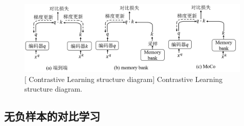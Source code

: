 \begin{figure}[h]
    \centering
    \includegraphics[width=1.0\columnwidth]{figures/RelatedWork/对比学习结构.png}
    [ Contrastive Learning structure diagram]{ Contrastive Learning structure diagram.}
    \label{figure1: 对比学习结构示意图}
\end{figure}





\subsection[\hspace{-2pt}无负样本的对比学习]{{\heiti{} \hspace{-8pt}无负样本的对比学习}}\label{section2: 无负样本的对比学习}

